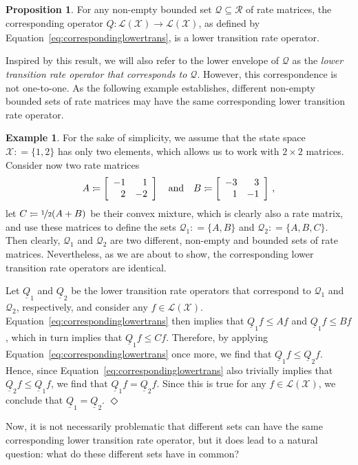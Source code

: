 \documentclass[10pt,a4paper]{paper}
\theoremstyle{definition}
\newtheorem{exmp}{Example}%
\newtheorem{proposition}[theorem]{Proposition}
\newcommand{\states}{\mathcal{X}}
\newcommand{\gambles}{\mathcal{L}}
\newcommand{\gamblesX}{\gambles(\states)}
\newcommand{\rateset}{\mathcal{Q}}
\newcommand{\lrate}{\underline{Q}}
\newcommand{\coloneqq}{:\!=}
\newcommand{\exampleend}{\hfill$\Diamond$}
\begin{document}
\begin{proposition}\label{prop:lowerenvelopeislowertrans}
For any non-empty bounded set $\rateset\subseteq\mathcal{R}$ of rate matrices, the corresponding operator $\lrate\colon\gamblesX\to\gamblesX$, as defined by Equation~\eqref{eq:correspondinglowertrans}, is a lower transition rate operator.
\end{proposition}

\noindent
Inspired by this result, we will also refer to the lower envelope of $\rateset$ as the \emph{lower transition rate operator that corresponds to $\rateset$}. %
However, this correspondence is not one-to-one. As the following example establishes, different non-empty bounded sets of rate matrices may have the same corresponding lower transition rate operator.

\begin{exmp}\label{example:different_sets_same_lower_rate}
For the sake of simplicity, we assume that the state space $\states\coloneqq\{1,2\}$ has only two elements, which allows us to work with $2\times 2$ matrices. Consider now two rate matrices
\begin{equation*}
A\coloneqq\left[\begin{array}{rr}-1 & 1 \\2 & -2\end{array}\right]\quad\text{and}\quad
B\coloneqq\left[\begin{array}{rr}-3 & 3 \\1 & -1\end{array}\right]\,,
\vspace{7pt}
\end{equation*}
let $C\coloneqq \nicefrac{1}{2}(A+B)$ be their convex mixture, which is clearly also a rate matrix, and use these matrices to define the sets $\rateset_1\coloneqq\{A,B\}$ and $\rateset_2\coloneqq\{A,B,C\}$. Then clearly, $\rateset_1$ and $\rateset_2$ are two different, non-empty and bounded sets of rate matrices. Nevertheless, as we are about to show, the corresponding lower transition rate operators are identical.

Let $\lrate_1$ and $\lrate_2$ be the lower transition rate operators that correspond to $\rateset_1$ and $\rateset_2$, respectively, %
and consider any $f\in\gamblesX$. Equation~\eqref{eq:correspondinglowertrans} then implies that $\lrate_1f\leq Af$ and $\lrate_1f\leq Bf$, which in turn implies that $\lrate_1f\leq Cf$. Therefore, by applying Equation~\eqref{eq:correspondinglowertrans} once more, we find that $\lrate_1 f\leq\lrate_2 f$. Hence, since Equation~\eqref{eq:correspondinglowertrans} also trivially implies that $\lrate_2 f\leq\lrate_1 f$, we find that $\lrate_1 f=\lrate_2 f$. Since this is true for any $f\in\gamblesX$, we conclude that $\lrate_1=\lrate_2$.
\exampleend
\end{exmp}
Now, it is not necessarily problematic that different sets can have the same corresponding lower transition rate operator, but it does lead to a natural question: what do these different sets have in common?
\end{document}
